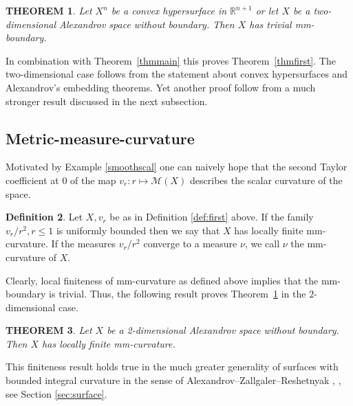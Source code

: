 \documentclass[12pt,leqno,intlimits]{amsart}
\numberwithin{equation}{section}
\newtheorem{thm}{THEOREM}[section]
\theoremstyle{definition}
\newtheorem{defn}[thm]{Definition}%
\theoremstyle{remark}
\newcommand{\tref}[1]{Theorem~\ref{#1}}
\newcommand{\R}{\mathbb{R}}
\begin{document}
\begin{thm} \label{hypersurface}
Let $X^n$ be a convex hypersurface in $\R^{n+1}$  or let $X$ be a two-dimensional  Alexandrov space without boundary. Then $X$ has trivial mm-boundary.
\end{thm}


In combination with \tref{thmmain} this proves \tref{thmfirst}.
The two-dimensional case follows from  the statement about convex hypersurfaces and  Alexandrov's embedding theorems.
Yet another proof follow from a much stronger result discussed in the next subsection.

\subsection{Metric-measure-curvature} \label{subsec:curv}
Motivated by Example \ref{smoothscal} one can naively hope that the second Taylor coefficient at $0$ of the
map $v_r\colon r\mapsto \mathcal M(X)$ describes the scalar curvature of the space.



\begin{defn}
 Let $X,v_r$ be as  in Definition \ref{def:first} above. If the family $v_r /r^2, r\leq 1$ is uniformly  bounded then we say that $X$ has locally finite  mm-curvature.
  If the measures $v_r /r^2$  converge to a measure $\nu$, we call $\nu$ the mm-curvature of $X$.
\end{defn}

Clearly, local finiteness of mm-curvature as defined above implies that the mm-boundary is trivial.
Thus, the following result proves \tref{hypersurface} in the $2$-dimensional case.


\begin{thm} \label{intsurface}
 Let $X$ be a 2-dimensional Alexandrov space without boundary.
 Then $X$ has locally finite mm-curvature.
\end{thm}


This finiteness result holds true in the much greater generality of surfaces  with bounded integral curvature in the sense of Alexandrov--Zallgaler--Reshetnyak \cite{Reshetnyak-GeomIV}, \cite{AZ}, see Section \ref{sec:surface}.
\end{document}
